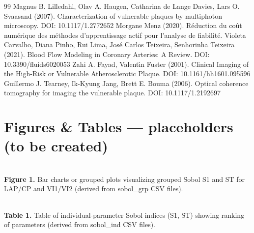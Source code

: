 \documentclass[preprint,12pt]{elsarticle}
\begin{document}
\begin{thebibliography}{99}
 Magnus B. Lilledahl, Olav A. Haugen, Catharina de Lange Davies, Lars O. Svaasand (2007). Characterization of vulnerable plaques by multiphoton microscopy. DOI: 10.1117/1.2772652
 Morgane Menz (2020). Réduction du coût numérique des méthodes d’apprentissage actif pour l’analyse de fiabilité.
 Violeta Carvalho, Diana Pinho, Rui Lima, José Carlos Teixeira, Senhorinha Teixeira (2021). Blood Flow Modeling in Coronary Arteries: A Review. DOI: 10.3390/fluids6020053
 Zahi A. Fayad, Valentı́n Fuster (2001). Clinical Imaging of the High-Risk or Vulnerable Atherosclerotic Plaque. DOI: 10.1161/hh1601.095596
 Guillermo J. Tearney, Ik‐Kyung Jang, Brett E. Bouma (2006). Optical coherence tomography for imaging the vulnerable plaque. DOI: 10.1117/1.2192697
\end{thebibliography}

\clearpage
\section*{Figures \& Tables — placeholders (to be created)}
\begin{center}
\\[5pt]
\textbf{Figure 1.} Bar charts or grouped plots visualizing grouped Sobol S1 and ST for LAP/CP and VI1/VI2 (derived from sobol\_grp CSV files).
\end{center}
\vspace{10pt}
\begin{center}
\\[5pt]
\textbf{Table 1.} Table of individual-parameter Sobol indices (S1, ST) showing ranking of parameters (derived from sobol\_ind CSV files).
\end{center}
\vspace{10pt}
\end{document}
